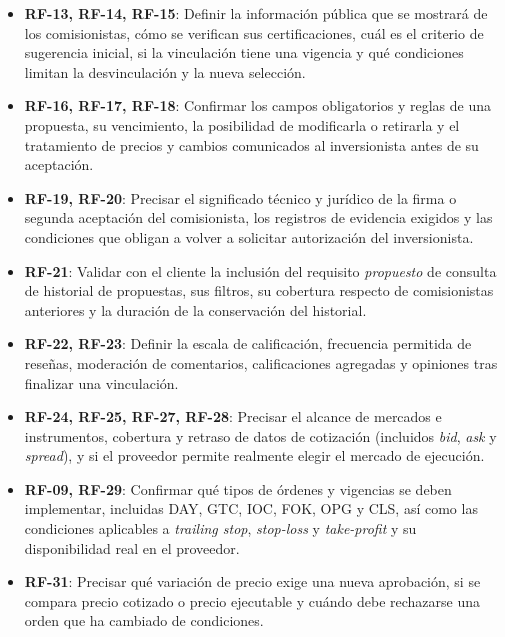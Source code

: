 \documentclass[11pt,a4paper,oneside]{article}
\begin{document}
\begin{itemize}
\item \textbf{RF-13, RF-14, RF-15}: Definir la información pública
  que se mostrará de los comisionistas, cómo se verifican sus
  certificaciones, cuál es el criterio de sugerencia inicial,
  si la vinculación tiene una vigencia y qué condiciones limitan
  la desvinculación y la nueva selección.

\item \textbf{RF-16, RF-17, RF-18}: Confirmar los campos obligatorios
  y reglas de una propuesta, su vencimiento, la posibilidad de modificarla
  o retirarla y el tratamiento de precios y cambios comunicados al
  inversionista antes de su aceptación.

\item \textbf{RF-19, RF-20}: Precisar el significado técnico y jurídico
  de la firma o segunda aceptación del comisionista, los registros
  de evidencia exigidos y las condiciones que obligan a volver
  a solicitar autorización del inversionista.

\item \textbf{RF-21}: Validar con el cliente la inclusión del requisito
  \emph{propuesto} de consulta de historial de propuestas, sus filtros,
  su cobertura respecto de comisionistas anteriores y la duración
  de la conservación del historial.

\item \textbf{RF-22, RF-23}: Definir la escala de calificación,
  frecuencia permitida de reseñas, moderación de comentarios,
  calificaciones agregadas y opiniones tras finalizar una vinculación.

\item \textbf{RF-24, RF-25, RF-27, RF-28}: Precisar el alcance
  de mercados e instrumentos, cobertura y retraso de datos de
  cotización (incluidos \textit{bid}, \textit{ask} y \textit{spread}),
  y si el proveedor permite realmente elegir el mercado de ejecución.

\item \textbf{RF-09, RF-29}: Confirmar qué tipos de órdenes y vigencias
  se deben implementar, incluidas DAY, GTC, IOC, FOK, OPG y CLS,
  así como las condiciones aplicables a \textit{trailing stop},
  \textit{stop-loss} y \textit{take-profit} y su disponibilidad real
  en el proveedor.

\item \textbf{RF-31}: Precisar qué variación de precio exige
  una nueva aprobación, si se compara precio cotizado o precio ejecutable
  y cuándo debe rechazarse una orden que ha cambiado de condiciones.


\end{itemize}
\end{document}

